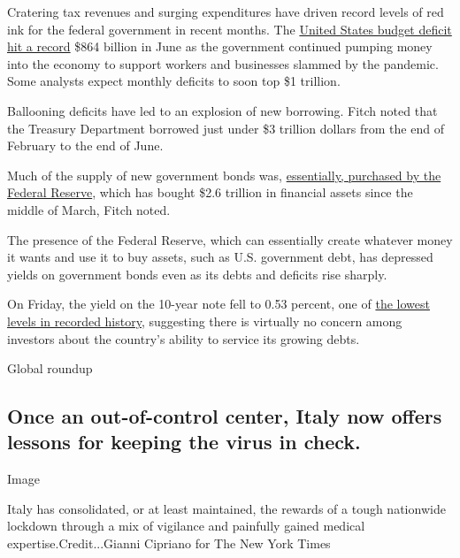 Cratering tax revenues and surging expenditures have driven record
levels of red ink for the federal government in recent months. The
\href{https://www.nytimes.com/live/2020/07/13/business/stock-market-today-coronavirus\#the-us-budget-deficit-hits-another-monthly-record}{United
States budget deficit hit a record} \$864 billion in June as the
government continued pumping money into the economy to support workers
and businesses slammed by the pandemic. Some analysts expect monthly
deficits to soon top \$1 trillion.

Ballooning deficits have led to an explosion of new borrowing. Fitch
noted that the Treasury Department borrowed just under \$3 trillion
dollars from the end of February to the end of June.

Much of the supply of new government bonds was,
\href{https://www.nytimes.com/2020/04/15/business/coronavirus-stimulus-money.html}{essentially,
purchased by the Federal Reserve}, which has bought \$2.6 trillion in
financial assets since the middle of March, Fitch noted.

The presence of the Federal Reserve, which can essentially create
whatever money it wants and use it to buy assets, such as U.S.
government debt, has depressed yields on government bonds even as its
debts and deficits rise sharply.

On Friday, the yield on the 10-year note fell to 0.53 percent, one of
\href{https://www.marketwatch.com/story/10-year-treasury-yield-plunged-to-its-lowest-in-234-years-says-deutsche-bank-11596214464\#:~:text=The\%2010\%2Dyear\%20Treasury\%20note,scurrying\%20into\%20safe\%20haven\%20assets.}{the
lowest levels in recorded history}, suggesting there is virtually no
concern among investors about the country's ability to service its
growing debts.

Global roundup

\hypertarget{once-an-out-of-control-center-italy-now-offers-lessons-for-keeping-the-virus-in-check}{%
\subsection{Once an out-of-control center, Italy now offers lessons for
keeping the virus in
check.}\label{once-an-out-of-control-center-italy-now-offers-lessons-for-keeping-the-virus-in-check}}

Image

Italy has consolidated, or at least maintained, the rewards of a tough
nationwide lockdown through a mix of vigilance and painfully gained
medical expertise.Credit...Gianni Cipriano for The New York Times

